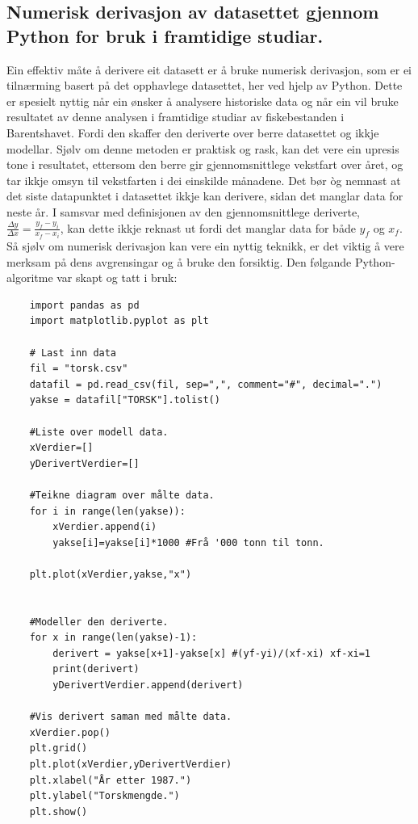 \documentclass{report}
\begin{document}
\subsection{Numerisk derivasjon av datasettet gjennom Python for bruk i framtidige studiar.}
Ein effektiv måte å derivere eit datasett er å bruke numerisk derivasjon, som er ei tilnærming basert på det opphavlege datasettet, her ved hjelp av Python.
Dette er spesielt nyttig når ein ønsker å analysere historiske data og når ein vil bruke resultatet av denne analysen i framtidige studiar av fiskebestanden i Barentshavet.
Fordi den skaffer den deriverte over berre datasettet og ikkje modellar.
Sjølv om denne metoden er praktisk og rask, kan det vere ein upresis tone i resultatet, ettersom den berre gir gjennomsnittlege vekstfart over året, og tar ikkje omsyn til vekstfarten i dei einskilde månadene.
Det bør òg nemnast at det siste datapunktet i datasettet ikkje kan derivere, sidan det manglar data for neste år. I samsvar med definisjonen av den gjennomsnittlege deriverte, $\frac{\Delta y}{\Delta x}=\frac{y_f-y_i}{x_f-x_i}$, kan dette ikkje reknast ut fordi det manglar data for både $y_f$ og $x_f$. Så sjølv om numerisk derivasjon kan vere ein nyttig teknikk, er det viktig å vere merksam på dens avgrensingar og å bruke den forsiktig.
\newline\newline
Den følgande Python-algoritme var skapt og tatt i bruk:
\begin{verbatim}
    import pandas as pd
    import matplotlib.pyplot as plt

    # Last inn data
    fil = "torsk.csv"
    datafil = pd.read_csv(fil, sep=",", comment="#", decimal=".")
    yakse = datafil["TORSK"].tolist()

    #Liste over modell data.
    xVerdier=[]
    yDerivertVerdier=[]

    #Teikne diagram over målte data.
    for i in range(len(yakse)):
        xVerdier.append(i)
        yakse[i]=yakse[i]*1000 #Frå '000 tonn til tonn.

    plt.plot(xVerdier,yakse,"x")


    #Modeller den deriverte.
    for x in range(len(yakse)-1):
        derivert = yakse[x+1]-yakse[x] #(yf-yi)/(xf-xi) xf-xi=1
        print(derivert)
        yDerivertVerdier.append(derivert)

    #Vis derivert saman med målte data.
    xVerdier.pop()
    plt.grid()
    plt.plot(xVerdier,yDerivertVerdier)
    plt.xlabel("År etter 1987.")
    plt.ylabel("Torskmengde.")
    plt.show()
\end{verbatim}
\end{document}
